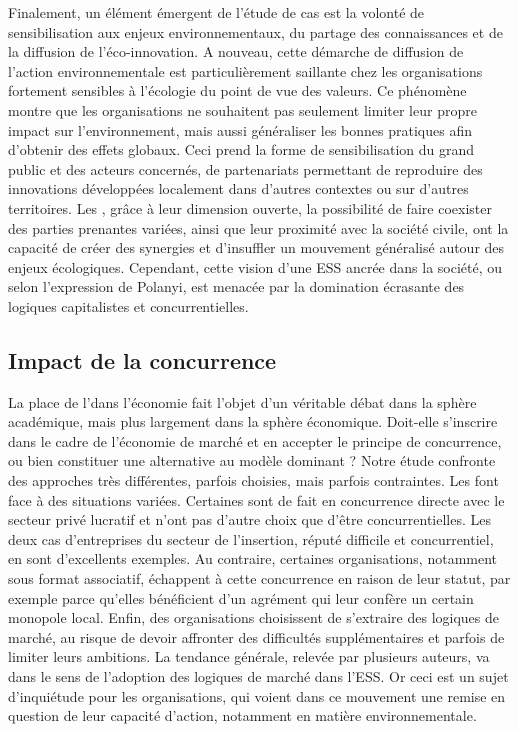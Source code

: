         Finalement, un élément émergent de l'étude de cas est la volonté de sensibilisation aux enjeux environnementaux, du partage des connaissances et de la diffusion de l'éco-innovation. A nouveau, cette démarche de diffusion de l'action environnementale est particulièrement saillante chez les organisations fortement sensibles à l'écologie du point de vue des valeurs. Ce phénomène montre que les organisations ne souhaitent pas seulement limiter leur propre impact sur l'environnement, mais aussi généraliser les bonnes pratiques afin d'obtenir des effets globaux. Ceci prend la forme de sensibilisation du grand public et des acteurs concernés, de partenariats permettant de reproduire des innovations développées localement dans d'autres contextes ou sur d'autres territoires. Les \oess, grâce à leur dimension ouverte, la possibilité de faire coexister des parties prenantes variées, ainsi que leur proximité avec la société civile, ont la capacité de créer des synergies et d'insuffler un mouvement généralisé autour des enjeux écologiques. Cependant, cette vision d'une ESS ancrée dans la société, ou  selon l'expression de Polanyi, est menacée par la domination écrasante des logiques capitalistes et concurrentielles.

    \subsection{Impact de la concurrence}

        La place de l'\ess dans l'économie fait l'objet d'un véritable débat dans la sphère académique, mais plus largement dans la sphère économique. Doit-elle s'inscrire dans le cadre de l'économie de marché et en accepter le principe de concurrence, ou bien constituer une alternative au modèle dominant ? Notre étude confronte des approches très différentes, parfois choisies, mais parfois contraintes. Les \eess font face à des situations variées. Certaines sont de fait en concurrence directe avec le secteur privé lucratif et n'ont pas d'autre choix que d'être concurrentielles. Les deux cas d'entreprises du secteur de l'insertion, réputé difficile et concurrentiel, en sont d'excellents exemples. Au contraire, certaines organisations, notamment sous format associatif, échappent à cette concurrence en raison de leur statut, par exemple parce qu'elles bénéficient d'un agrément qui leur confère un certain monopole local. Enfin, des organisations choisissent de s'extraire des logiques de marché, au risque de devoir affronter des difficultés supplémentaires et parfois de limiter leurs ambitions. La tendance générale, relevée par plusieurs auteurs, va dans le sens de l'adoption des logiques de marché dans l'ESS. Or ceci est un sujet d'inquiétude pour les organisations, qui voient dans ce mouvement une remise en question de leur capacité d'action, notamment en matière environnementale. \\

